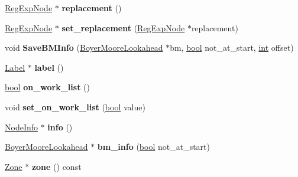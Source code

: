 \begin{DoxyCompactItemize}
\item 
\mbox{\label{classv8_1_1internal_1_1RegExpNode_a5106a9e3526079e16cc999ba4bbadad1}} 
\mbox{\hyperlink{classv8_1_1internal_1_1RegExpNode}{Reg\+Exp\+Node}} $\ast$ {\bfseries replacement} ()
\item 
\mbox{\label{classv8_1_1internal_1_1RegExpNode_abe1b803364b2e377ec428bc9920c94ca}} 
\mbox{\hyperlink{classv8_1_1internal_1_1RegExpNode}{Reg\+Exp\+Node}} $\ast$ {\bfseries set\+\_\+replacement} (\mbox{\hyperlink{classv8_1_1internal_1_1RegExpNode}{Reg\+Exp\+Node}} $\ast$replacement)
\item 
\mbox{\label{classv8_1_1internal_1_1RegExpNode_a6267579804303b6f30263d6470949ffe}} 
void {\bfseries Save\+B\+M\+Info} (\mbox{\hyperlink{classv8_1_1internal_1_1BoyerMooreLookahead}{Boyer\+Moore\+Lookahead}} $\ast$bm, \mbox{\hyperlink{classbool}{bool}} not\+\_\+at\+\_\+start, \mbox{\hyperlink{classint}{int}} offset)
\item 
\mbox{\label{classv8_1_1internal_1_1RegExpNode_a1a0b5a61d350613e23c5014f80e79d3e}} 
\mbox{\hyperlink{classv8_1_1internal_1_1Label}{Label}} $\ast$ {\bfseries label} ()
\item 
\mbox{\label{classv8_1_1internal_1_1RegExpNode_aa140eaf712345d61115c6cfbc8042cc9}} 
\mbox{\hyperlink{classbool}{bool}} {\bfseries on\+\_\+work\+\_\+list} ()
\item 
\mbox{\label{classv8_1_1internal_1_1RegExpNode_af06878e6453358c2cec014fd3e7e97bd}} 
void {\bfseries set\+\_\+on\+\_\+work\+\_\+list} (\mbox{\hyperlink{classbool}{bool}} value)
\item 
\mbox{\label{classv8_1_1internal_1_1RegExpNode_a9a3f9318b3322877937dbd62b479531d}} 
\mbox{\hyperlink{structv8_1_1internal_1_1NodeInfo}{Node\+Info}} $\ast$ {\bfseries info} ()
\item 
\mbox{\label{classv8_1_1internal_1_1RegExpNode_a11d15a06b5e058ace41d292bdb261c9a}} 
\mbox{\hyperlink{classv8_1_1internal_1_1BoyerMooreLookahead}{Boyer\+Moore\+Lookahead}} $\ast$ {\bfseries bm\+\_\+info} (\mbox{\hyperlink{classbool}{bool}} not\+\_\+at\+\_\+start)
\item 
\mbox{\label{classv8_1_1internal_1_1RegExpNode_a132a31421b99711e1482b7a9aa35ad57}} 
\mbox{\hyperlink{classv8_1_1internal_1_1Zone}{Zone}} $\ast$ {\bfseries zone} () const
\end{DoxyCompactItemize}

